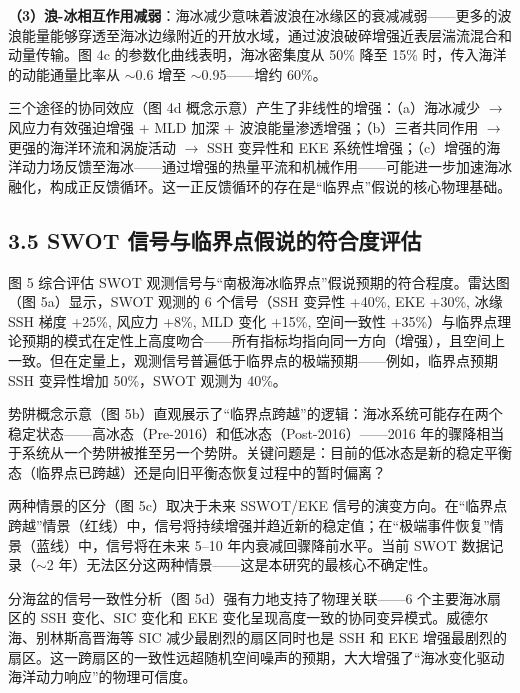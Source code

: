 \documentclass[11pt,a4paper]{article}
\begin{document}
\textbf{（3）浪-冰相互作用减弱}：海冰减少意味着波浪在冰缘区的衰减减弱——更多的波浪能量能够穿透至海冰边缘附近的开放水域，通过波浪破碎增强近表层湍流混合和动量传输。图 4c 的参数化曲线表明，海冰密集度从 50\% 降至 15\% 时，传入海洋的动能通量比率从 $\sim$0.6 增至 $\sim$0.95——增约 60\%。\par

三个途径的协同效应（图 4d 概念示意）产生了非线性的增强：（a）海冰减少 $\to$ 风应力有效强迫增强 + MLD 加深 + 波浪能量渗透增强；（b）三者共同作用 $\to$ 更强的海洋环流和涡旋活动 $\to$ SSH 变异性和 EKE 系统性增强；（c）增强的海洋动力场反馈至海冰——通过增强的热量平流和机械作用——可能进一步加速海冰融化，构成正反馈循环。这一正反馈循环的存在是``临界点''假说的核心物理基础。\par

\subsection*{3.5  SWOT 信号与临界点假说的符合度评估}

图 5 综合评估 SWOT 观测信号与``南极海冰临界点''假说预期的符合程度。雷达图（图 5a）显示，SWOT 观测的 6 个信号（SSH 变异性 +40\%, EKE +30\%, 冰缘 SSH 梯度 +25\%, 风应力 +8\%, MLD 变化 +15\%, 空间一致性 +35\%）与临界点理论预期的模式在定性上高度吻合——所有指标均指向同一方向（增强），且空间上一致。但在定量上，观测信号普遍低于临界点的极端预期——例如，临界点预期 SSH 变异性增加 50\%，SWOT 观测为 40\%。\par

势阱概念示意（图 5b）直观展示了``临界点跨越''的逻辑：海冰系统可能存在两个稳定状态——高冰态（Pre-2016）和低冰态（Post-2016）——2016 年的骤降相当于系统从一个势阱被推至另一个势阱。关键问题是：目前的低冰态是新的稳定平衡态（临界点已跨越）还是向旧平衡态恢复过程中的暂时偏离？\par

两种情景的区分（图 5c）取决于未来 SSWOT/EKE 信号的演变方向。在``临界点跨越''情景（红线）中，信号将持续增强并趋近新的稳定值；在``极端事件恢复''情景（蓝线）中，信号将在未来 5--10 年内衰减回骤降前水平。当前 SWOT 数据记录（$\sim$2 年）无法区分这两种情景——这是本研究的最核心不确定性。\par

分海盆的信号一致性分析（图 5d）强有力地支持了物理关联——6 个主要海冰扇区的 SSH 变化、SIC 变化和 EKE 变化呈现高度一致的协同变异模式。威德尔海、别林斯高晋海等 SIC 减少最剧烈的扇区同时也是 SSH 和 EKE 增强最剧烈的扇区。这一跨扇区的一致性远超随机空间噪声的预期，大大增强了``海冰变化驱动海洋动力响应''的物理可信度。\par
\end{document}
